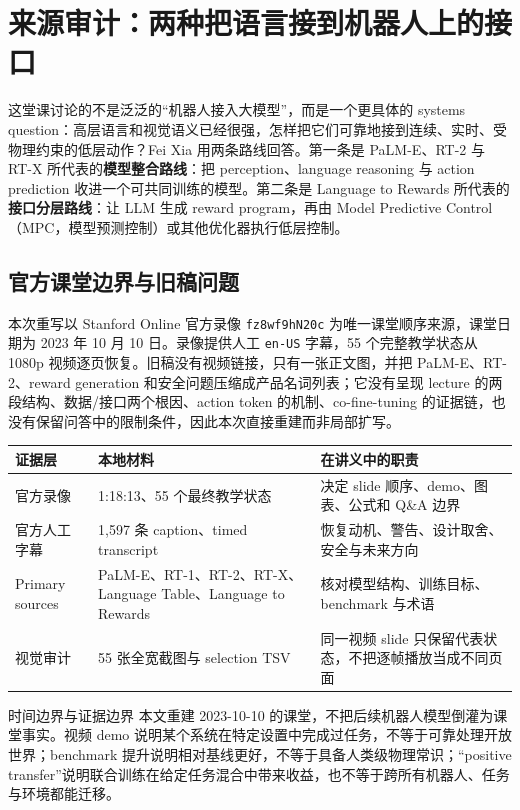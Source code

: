 \section{来源审计：两种把语言接到机器人上的接口}

这堂课讨论的不是泛泛的“机器人接入大模型”，而是一个更具体的 systems question：高层语言和视觉语义已经很强，怎样把它们可靠地接到连续、实时、受物理约束的低层动作？Fei Xia 用两条路线回答。第一条是 PaLM-E、RT-2 与 RT-X 所代表的\textbf{模型整合路线}：把 perception、language reasoning 与 action prediction 收进一个可共同训练的模型。第二条是 Language to Rewards 所代表的\textbf{接口分层路线}：让 LLM 生成 reward program，再由 Model Predictive Control（MPC，模型预测控制）或其他优化器执行低层控制。

\subsection{官方课堂边界与旧稿问题}

本次重写以 Stanford Online 官方录像 \texttt{fz8wf9hN20c} 为唯一课堂顺序来源，课堂日期为 2023 年 10 月 10 日。录像提供人工 \texttt{en-US} 字幕，55 个完整教学状态从 1080p 视频逐页恢复。旧稿没有视频链接，只有一张正文图，并把 PaLM-E、RT-2、reward generation 和安全问题压缩成产品名词列表；它没有呈现 lecture 的两段结构、数据/接口两个根因、action token 的机制、co-fine-tuning 的证据链，也没有保留问答中的限制条件，因此本次直接重建而非局部扩写。

\begin{longtable}{@{}L{0.18\textwidth}L{0.31\textwidth}L{0.39\textwidth}@{}}
\toprule
证据层 & 本地材料 & 在讲义中的职责 \\
\midrule
官方录像 & 1:18:13、55 个最终教学状态 & 决定 slide 顺序、demo、图表、公式和 Q\&A 边界 \\
官方人工字幕 & 1,597 条 caption、timed transcript & 恢复动机、警告、设计取舍、安全与未来方向 \\
Primary sources & PaLM-E、RT-1、RT-2、RT-X、Language Table、Language to Rewards & 核对模型结构、训练目标、benchmark 与术语 \\
视觉审计 & 55 张全宽截图与 selection TSV & 同一视频 slide 只保留代表状态，不把逐帧播放当成不同页面 \\
\bottomrule
\end{longtable}

\begin{warningbox}{时间边界与证据边界}
本文重建 2023-10-10 的课堂，不把后续机器人模型倒灌为课堂事实。视频 demo 说明某个系统在特定设置中完成过任务，不等于可靠处理开放世界；benchmark 提升说明相对基线更好，不等于具备人类级物理常识；“positive transfer”说明联合训练在给定任务混合中带来收益，也不等于跨所有机器人、任务与环境都能迁移。
\end{warningbox}

